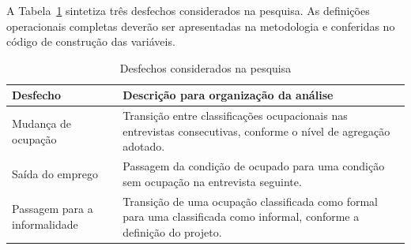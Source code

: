 A Tabela~\ref{tab:desfechos-pesquisa-pnadc} sintetiza três desfechos considerados na pesquisa. As definições operacionais completas deverão ser apresentadas na metodologia e conferidas no código de construção das variáveis.

\begin{table}[htb]
  \caption{Desfechos considerados na pesquisa}
  \label{tab:desfechos-pesquisa-pnadc}
  \centering
  \begin{tabular}{p{} p{}}
    \hline
    \textbf{Desfecho} & \textbf{Descrição para organização da análise} \\
    \hline
    Mudança de ocupação &
    Transição entre classificações ocupacionais nas entrevistas consecutivas, conforme o nível de agregação adotado. \\
    \hline
    Saída do emprego &
    Passagem da condição de ocupado para uma condição sem ocupação na entrevista seguinte. \\
    \hline
    Passagem para a informalidade &
    Transição de uma ocupação classificada como formal para uma classificada como informal, conforme a definição do projeto. \\
    \hline
  \end{tabular}
\end{table}